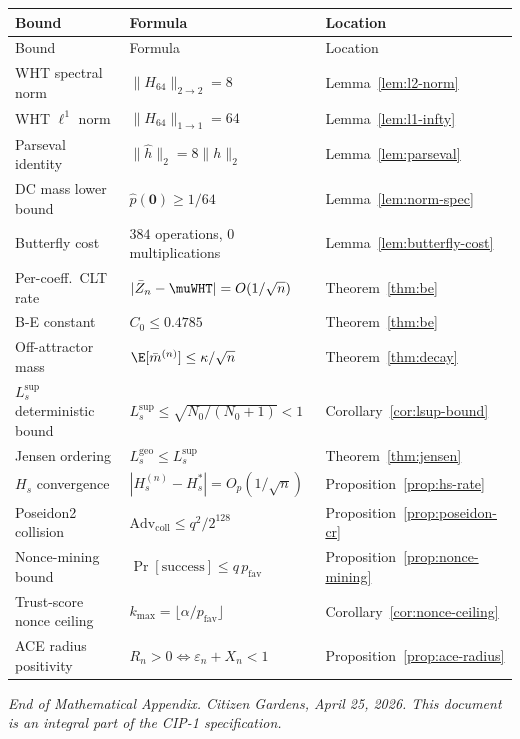 \documentclass[12pt,letterpaper]{article}
\theoremstyle{definition}
\theoremstyle{plain}
\theoremstyle{remark}
\newcommand{\hhat}{\hat{h}}
\newcommand{\mbar}{\bar{m}}
\newcommand{\Lsup}{L_s^{\sup}}
\newcommand{\Lgeo}{L_s^{\mathrm{geo}}}
\begin{document}
\begin{center}
\begin{longtable}{p{3.5cm}p{5.5cm}p{3.5cm}}
\toprule
Bound & Formula & Location \\
\midrule
\endfirsthead
\toprule
Bound & Formula & Location \\
\midrule
\endhead
WHT spectral norm
  & $\|H_{64}\|_{2\to 2} = 8$
  & Lemma~\ref{lem:l2-norm} \\
WHT $\ell^1$ norm
  & $\|H_{64}\|_{1\to 1} = 64$
  & Lemma~\ref{lem:l1-infty} \\
Parseval identity
  & $\|\hhat\|_2 = 8\|h\|_2$
  & Lemma~\ref{lem:parseval} \\
DC mass lower bound
  & $\hat{p}(\mathbf{0}) \ge 1/64$
  & Lemma~\ref{lem:norm-spec} \\
Butterfly cost
  & $384$ operations, $0$ multiplications
  & Lemma~\ref{lem:butterfly-cost} \\
Per-coeff.\ CLT rate
  & $|\bar{Z}_n - \muWHT| = O(1/\sqrt{n})$
  & Theorem~\ref{thm:be} \\
B-E constant
  & $C_0 \le 0.4785$
  & Theorem~\ref{thm:be} \\
Off-attractor mass
  & $\E[\mbar^{(n)}] \le \kappa/\sqrt{n}$
  & Theorem~\ref{thm:decay} \\
$\Lsup$ deterministic bound
  & $\Lsup \le \sqrt{N_0/(N_0+1)} < 1$
  & Corollary~\ref{cor:lsup-bound} \\
Jensen ordering
  & $\Lgeo \le \Lsup$
  & Theorem~\ref{thm:jensen} \\
$H_s$ convergence
  & $|H_s^{(n)} - H_s^*| = O_p(1/\sqrt{n})$
  & Proposition~\ref{prop:hs-rate} \\
Poseidon2 collision
  & $\mathrm{Adv}_{\mathrm{coll}} \le q^2/2^{128}$
  & Proposition~\ref{prop:poseidon-cr} \\
Nonce-mining bound
  & $\Pr[\text{success}] \le q\,p_{\mathrm{fav}}$
  & Proposition~\ref{prop:nonce-mining} \\
Trust-score nonce ceiling
  & $k_{\max} = \lfloor\alpha/p_{\mathrm{fav}}\rfloor$
  & Corollary~\ref{cor:nonce-ceiling} \\
ACE radius positivity
  & $R_n > 0 \iff \varepsilon_n + X_n < 1$
  & Proposition~\ref{prop:ace-radius} \\
\bottomrule
\end{longtable}
\end{center}

\vspace{1em}
\noindent\textit{%
End of Mathematical Appendix.
Citizen Gardens, April 25, 2026.
This document is an integral part of the CIP-1 specification.%
}

\nocite{*}
  

\end{document}
